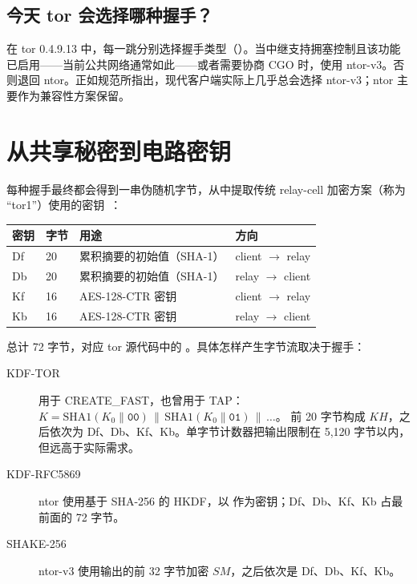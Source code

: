 \subsection{今天 tor 会选择哪种握手？}

在 tor 0.4.9.13 中，每一跳分别选择握手类型（）。当中继支持拥塞控制且该功能已启用——当前公共网络通常如此——或者需要协商 CGO 时，使用 ntor-v3。否则退回 ntor。正如规范所指出，现代客户端实际上几乎总会选择 ntor-v3；ntor 主要作为兼容性方案保留。

\section{从共享秘密到电路密钥}\label{sec:circ-chiavi}

每种握手最终都会得到一串伪随机字节，从中提取传统 relay-cell 加密方案（称为 \enquote{tor1}）使用的密钥~：

\begin{center}
\begin{tabular}{llll}
\toprule
密钥 & 字节 & 用途 & 方向 \\
\midrule
Df & 20 & 累积摘要的初始值（SHA-1） & client $\to$ relay \\
Db & 20 & 累积摘要的初始值（SHA-1） & relay $\to$ client \\
Kf & 16 & AES-128-CTR 密钥 & client $\to$ relay \\
Kb & 16 & AES-128-CTR 密钥 & relay $\to$ client \\
\bottomrule
\end{tabular}
\end{center}

总计 72 字节，对应 tor 源代码中的 。具体怎样产生字节流取决于握手：
\begin{description}
  \item[KDF-TOR] 用于 CREATE\_FAST，也曾用于 TAP：
  $K=\mathrm{SHA1}(K_0\|\texttt{00})\,\|\,\mathrm{SHA1}(K_0\|\texttt{01})\,\|\,\ldots$。
  前 20 字节构成 $KH$，之后依次为 Df、Db、Kf、Kb。单字节计数器把输出限制在 5,120 字节以内，但远高于实际需求。
  \item[KDF-RFC5869] ntor 使用基于 SHA-256 的 HKDF，以  作为密钥；Df、Db、Kf、Kb 占最前面的 72 字节。
  \item[SHAKE-256] ntor-v3 使用输出的前 32 字节加密 $SM$，之后依次是 Df、Db、Kf、Kb。
\end{description}

